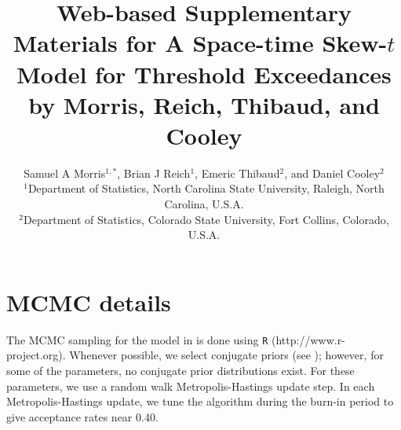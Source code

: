 \documentclass[useAMS,usenatbib,referee]{biomweb}
\title[Web-based Supplementary Materials for A Space-time Skew-$t$ Model for Threshold Exceedances]{Web-based Supplementary Materials for A Space-time Skew-$t$ Model for Threshold Exceedances by Morris, Reich, Thibaud, and Cooley}
\author
{Samuel A Morris$^{1,*}$\email{samorris@ncsu.edu},
Brian J Reich$^{1}$,
Emeric Thibaud$^{2}$, and
Daniel Cooley$^{2}$\\
$^{1}$Department of Statistics, North Carolina State University, Raleigh, North Carolina, U.S.A. \\
$^{2}$Department of Statistics, Colorado State University, Fort Collins, Colorado, U.S.A.}
\begin{document}
\maketitle



\renewcommand{\thesection}{Web Appendix~\Alph{section}}

\section{MCMC details} \label{sta:mcmc}
The MCMC sampling for the model in  is done using {\tt R} (http://www.r-project.org). Whenever possible, we select conjugate priors (see ); however, for some of the parameters, no conjugate prior distributions exist.
For these parameters, we use a random walk Metropolis-Hastings update step.
In each Metropolis-Hastings update, we tune the algorithm during the burn-in period to give acceptance rates near 0.40.
\end{document}
